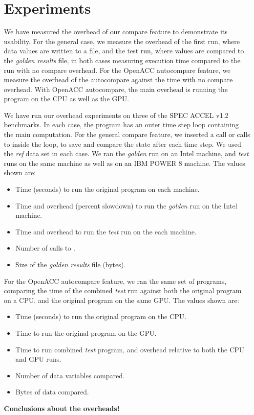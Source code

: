 \section{Experiments}

We have measured the overhead of our compare feature to demonstrate its usability.
For the general case, we measure the overhead of the first run, where data values are written to a file, and the test run, where values are compared to the \emph{golden results} file, in both cases measuring execution time compared to the run with no compare overhead.
For the OpenACC autocompare feature, we measure the overhead of the autocompare against the time with no compare overhead.
With OpenACC autocompare, the main overhead is running the program on the CPU as well as the GPU.


We have run our overhead experiments on three of the SPEC ACCEL v1.2 benchmarks.
In each case, the program has an outer time step loop containing the main computation.
For the general compare feature, we inserted a call or calls to  inside the loop, to save and compare the state after each time step.
We used the \emph{ref} data set in each case.
We ran the \emph{golden} run on an Intel machine, and \emph{test} runs on the same machine as well as on an IBM POWER 8 machine.
The values shown are:
\begin{itemize}
\item Time (seconds) to run the original program on each machine.
\item Time and overhead (percent slowdown) to run the \emph{golden} run on the Intel machine.
\item Time and overhead to run the \emph{test} run on the each machine.
\item Number of calls to .
\item Size of the \emph{golden results} file (bytes).
\end{itemize}

For the OpenACC autocompare feature, we ran the same set of programs, comparing the time of the combined \emph{test} run against both the original program on a CPU, and the original program on the same GPU.
The values shown are:
\begin{itemize}
\item Time (seconds) to run the original program on the CPU.
\item Time to run the original program on the GPU.
\item Time to run combined \emph{test} program, and overhead relative to both the CPU and GPU runs.
\item Number of data variables compared.
\item Bytes of data compared.
\end{itemize}

\textbf{Conclusions about the overheads!}

